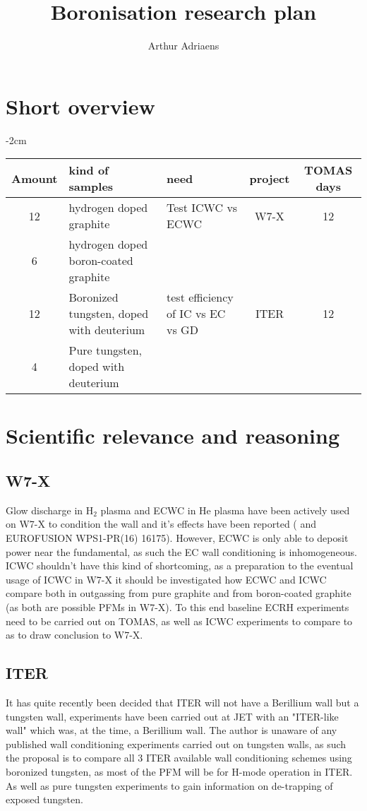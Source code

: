 \documentclass{article}
\title{Boronisation research plan}
\author{Arthur Adriaens}
\begin{document}
\maketitle

\section{Short overview}
\begin{center}
    \addtolength{\leftskip} {-2cm} %
    \addtolength{\rightskip}{-2cm}
    \begin{tabular}{||c p{4cm} p{4cm} c c||}
         \hline
         Amount & kind of samples & need & project & TOMAS days \\ [0.5ex]
         \hline\hline
         12 & hydrogen doped graphite & Test ICWC vs ECWC & W7-X & 12 \\
         6 & hydrogen doped boron-coated graphite & & & \\
         \hline
         12 & Boronized tungsten, doped with deuterium & test efficiency of IC vs EC vs GD & ITER & 12\\
         4 & Pure tungsten, doped with deuterium & & &\\
         \hline
    \end{tabular}
\end{center}
\section{Scientific relevance and reasoning}
\subsection*{W7-X}
Glow discharge in H$_2$ plasma and ECWC in He plasma have been actively used on W7-X 
to condition the wall and it's effects have been reported (\cite{WAUTERS2018235} and EUROFUSION WPS1-PR(16) 16175).
However, ECWC is only able to deposit power near the fundamental, as such the EC wall conditioning is
inhomogeneous. ICWC shouldn't have this kind of shortcoming, as a preparation to the eventual 
usage of ICWC in W7-X it should be investigated how ECWC and ICWC compare both in outgassing from
pure graphite and from boron-coated graphite (as both are possible PFMs in W7-X).
To this end baseline ECRH experiments need to be carried out on TOMAS, as well as ICWC experiments
to compare to as to draw conclusion to W7-X.
\subsection*{ITER}
It has quite recently been decided that ITER will not have a Berillium wall but a tungsten wall, 
experiments have been carried out at JET with an "ITER-like wall"\cite{DOUAI2013S1172} which
was, at the time, a Berillium wall. The author is unaware of any published wall conditioning experiments carried out 
on tungsten walls, as such the proposal is to compare all 3 ITER available wall conditioning schemes using
boronized tungsten, as most of the PFM will be for H-mode operation in ITER. As well as pure tungsten experiments
to gain information on de-trapping of exposed tungsten.
\end{document}
